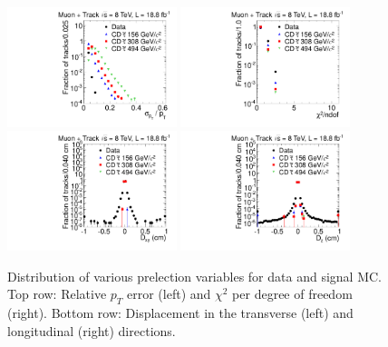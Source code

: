 \begin{figure}
\centering
  \includegraphics[clip=true, trim=0.0cm 0cm 2.8cm 0cm, width=0.44\textwidth]{figures/tkmu/Selection_Comp_8TeV_GMStau_Pterr_BS}
  \includegraphics[clip=true, trim=0.0cm 0cm 2.8cm 0cm, width=0.44\textwidth]{figures/tkmu/Selection_Comp_8TeV_GMStau_Chi2_BS} \\
  \includegraphics[clip=true, trim=0.0cm 0cm 2.8cm 0cm, width=0.44\textwidth]{figures/tkmu/Selection_Comp_8TeV_GMStau_Dxy_BS}
  \includegraphics[clip=true, trim=0.0cm 0cm 2.8cm 0cm, width=0.44\textwidth]{figures/tkmu/Selection_Comp_8TeV_GMStau_Dz_BS}
  \caption{Distribution of various prelection variables for data and signal MC.
Top row: Relative $p_T$ error (left) and $\chi^2$ per degree of freedom (right).
Bottom row: Displacement in the transverse (left) and longitudinal (right) directions.
    \label{fig:TkMuPreselB}}
\end{figure}

